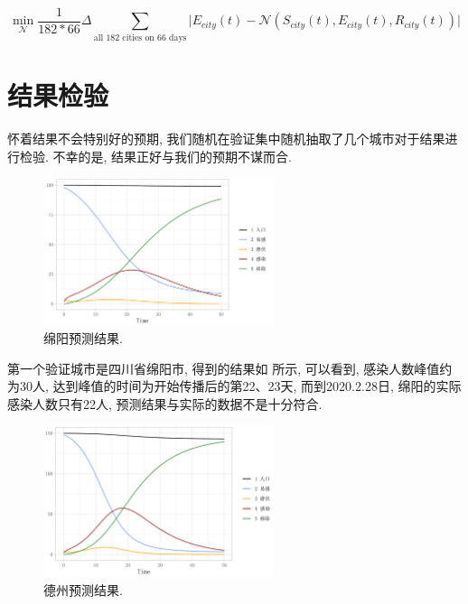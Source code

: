 \documentclass[lang=cn,11pt]{elegantpaper}
\begin{document}
\begin{equation}
	\min_{\mathcal N} \dfrac{1}{182*66}\Delta \sum_{\text{all 182 cities on 66 days}}\Big|E_{city}(t)-\mathcal N(S_{city}(t),E_{city}(t),R_{city}(t))\Big|
\end{equation}

\section{结果检验}
怀着结果不会特别好的预期, 我们随机在验证集中随机抽取了几个城市对于结果进行检验. 不幸的是, 结果正好与我们的预期不谋而合. 
\begin{figure}[htbp]
  \centering
  \hspace{25pt}\includegraphics[width=0.6\textwidth]{my}
  \caption{绵阳预测结果. \label{fig:my}}
\end{figure}
第一个验证城市是四川省绵阳市, 得到的结果如  所示, 可以看到, 感染人数峰值约为30人, 达到峰值的时间为开始传播后的第22、23天, 而到2020.2.28日, 绵阳的实际感染人数只有22人, 预测结果与实际的数据不是十分符合. 
\begin{figure}[htbp]
  \centering
  \hspace{25pt}\includegraphics[width=0.6\textwidth]{dz}
  \caption{德州预测结果. \label{fig:dz}}
\end{figure}
\end{document}
